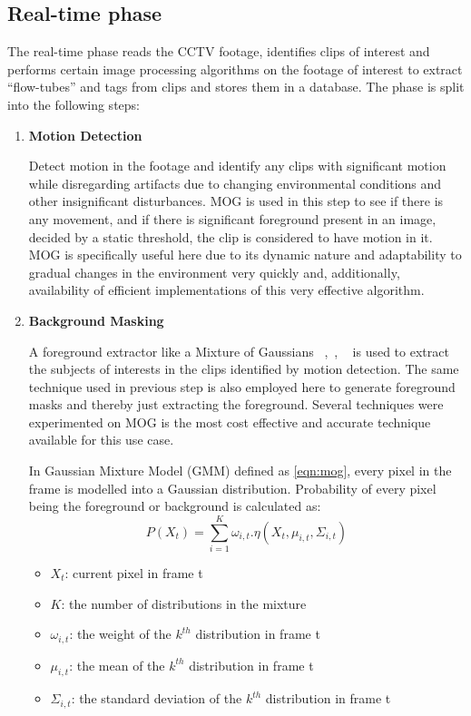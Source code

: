 \documentclass[conference]{IEEEtran}
\begin{document}
\subsection{Real-time phase}
The real-time phase reads the CCTV footage, identifies clips of interest and
performs certain image processing algorithms on the footage of interest to
extract “flow-tubes” and tags from clips and stores them in a database.
\cite{pritch2007webcam} The phase is split into the following steps:

\begin{enumerate}
    \item \textbf{Motion Detection}

    Detect motion in the footage and identify any clips with significant motion
    while disregarding artifacts due to changing environmental conditions and
    other insignificant disturbances.
    MOG is used in this step to see if there is any movement, and if there is
    significant foreground present in an image, decided by a static threshold,
    the clip is considered to have motion in it. MOG is specifically useful here
    due to its dynamic nature and adaptability to gradual changes in the
    environment very quickly and, additionally, availability of efficient
    implementations of this very effective algorithm.

    \item \textbf{Background Masking}

    A foreground extractor like a Mixture of Gaussians~
    \cite{zivkovic2004improved},~\cite{bouttefroy2010analysis},
    ~\cite{sun2006background} is used to extract the subjects of interests in
    the clips identified by motion detection. The same technique used in
    previous step is also employed here to generate foreground masks and
    thereby just extracting the foreground. Several techniques were
    experimented on MOG is the most cost effective
    and accurate technique available for this use case.

    In Gaussian Mixture Model (GMM) defined as \ref{eqn:mog}, every pixel in the frame is modelled into
    a Gaussian distribution. Probability of every pixel being the foreground or
    background is calculated as:
    \begin{equation}\label{eqn:mog}
    P\left(X_{t}\right) =
    \sum_{i=1}^{K} \omega_{i,t}.\eta(X_{t},\mu_{i,t},\Sigma_{i,t})
    \end{equation}

    \begin{itemize}
        \item \(X_{t}\): current pixel in frame t
        \item \(K\): the number of distributions in the mixture
        \item \(\omega_{i,t}\): the weight of the \(k^{th}\) distribution in frame t
        \item \(\mu_{i,t}\): the mean of the \(k^{th}\) distribution in frame t
        \item \(\Sigma_{i,t}\): the standard deviation of the \(k^{th}\)
        distribution in frame t
    \end{itemize}


\end{enumerate}
\end{document}
